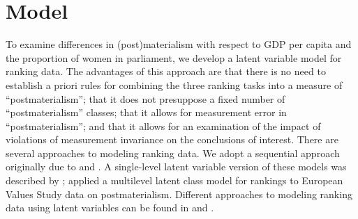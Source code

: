 \documentclass[letterpaper,12pt]{article}
\begin{document}
\clearpage
\section{Model}


To examine differences in (post)materialism with respect to GDP per capita and the proportion of women in parliament, we develop a latent variable model for ranking data. The advantages of this approach are that there is no need to establish a priori rules for combining the three ranking tasks into a measure of ``postmaterialism''; that it does not presuppose a fixed number of ``postmaterialism'' classes; that it allows for measurement error in ``postmaterialism''; and that it allows for an examination of the impact of violations of measurement invariance on the conclusions of interest. 
There are several approaches to modeling ranking data. We adopt a sequential approach originally due to \citet{luce1959individual} and \citet{mcfadden1974conditional}. A single-level latent variable  version of these models was described by \citet{bockenholt2002comparison}; \citet{moors2007heterogeneity} applied a multilevel latent class model for rankings to European Values Study data on postmaterialism. Different approaches to modeling ranking data using latent variables can be found in
\citet{maydeu2005structural} and \citet{brown2011item,brown2012fitting}. 
\end{document}
